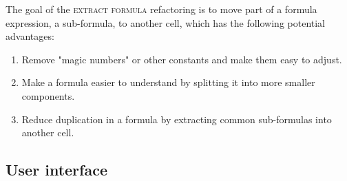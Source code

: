 \documentclass[12pt,a4paper,onecolumn,oneside,parskip]{memoir}
\newcommand{\rf}[1]{\textsc{\lowercase{#1}}}
\begin{document}
The goal of the \rf{extract formula} refactoring is to move part of a formula expression, a sub-formula, to another cell, which has the following potential advantages:

\begin{enumerate}
\item Remove "magic numbers" or other constants and make them easy to adjust.
\item Make a formula easier to understand by splitting it into more smaller components.
\item Reduce duplication in a formula by extracting common sub-formulas into another cell.
\end{enumerate}

\subsection{User interface}
\end{document}
